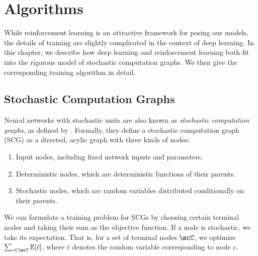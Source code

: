 \documentclass[12pt]{report}
\begin{document}


\chapter{Algorithms}
\label{chap:algorithms}

While reinforcement learning is an attractive framework for posing our models, the details of training are slightly complicated in the context of deep learning.
In this chapter, we describe how deep learning and reinforcement learning both fit into the rigorous model of stochastic computation graphs.
We then give the corresponding training algorithm in detail.

\section{Stochastic Computation Graphs}

Neural networks with stochastic units are also known as \emph{stochastic computation graphs}, as defined by \citet{schulman2015backprop}. Formally, they define a stochastic computation graph (SCG) as a directed, acylic graph with three kinds of nodes:
\begin{enumerate}
\item Input nodes, including fixed network inputs and parameters.
\item Deterministic nodes, which are deterministic functions of their parents.
\item Stochastic nodes, which are random variables distributed conditionally on their parents.
\end{enumerate}
We can formulate a training problem for SCGs by choosing certain terminal nodes and taking their sum as the objective function. If a node is stochastic, we take its expectation. That is, for a set of terminal nodes $\mcC$, we optimize $\sum_{c \in \mcC} \mathbb{E}[\hat{c}]$, where $\hat{c}$ denotes the random variable corresponding to node $c$.
\end{document}
